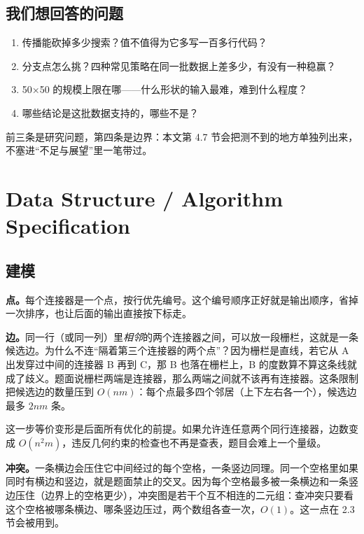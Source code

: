 \documentclass[12pt,a4paper,fontset=windows]{ctexart}
\begin{document}
\subsection{我们想回答的问题}

\begin{enumerate}[itemsep=3pt,topsep=2pt]
  \item 传播能砍掉多少搜索？值不值得为它多写一百多行代码？
  \item 分支点怎么挑？四种常见策略在同一批数据上差多少，有没有一种稳赢？
  \item 50×50 的规模上限在哪——什么形状的输入最难，难到什么程度？
  \item 哪些结论是这批数据支持的，哪些不是？
\end{enumerate}

前三条是研究问题，第四条是边界：本文第 4.7 节会把测不到的地方单独列出来，不塞进“不足与展望”里一笔带过。

\section{Data Structure / Algorithm Specification}

\subsection{建模}

\textbf{点。}每个连接器是一个点，按行优先编号。这个编号顺序正好就是输出顺序，省掉一次排序，也让后面的输出直接按下标走。

\textbf{边。}同一行（或同一列）里\emph{相邻}的两个连接器之间，可以放一段栅栏，这就是一条候选边。为什么不连“隔着第三个连接器的两个点”？因为栅栏是直线，若它从 A 出发穿过中间的连接器 B 再到 C，那 B 也落在栅栏上，B 的度数算不算这条线就成了歧义。题面说栅栏两端是连接器，那么两端之间就不该再有连接器。这条限制把候选边的数量压到 $O(nm)$：每个点最多四个邻居（上下左右各一个），候选边最多 $2nm$ 条。

这一步等价变形是后面所有优化的前提。如果允许连任意两个同行连接器，边数变成 $O(n^2m)$，违反几何约束的检查也不再是查表，题目会难上一个量级。

\textbf{冲突。}一条横边会压住它中间经过的每个空格，一条竖边同理。同一个空格里如果同时有横边和竖边，就是题面禁止的交叉。因为每个空格最多被一条横边和一条竖边压住（边界上的空格更少），冲突图是若干个互不相连的二元组：查冲突只要看这个空格被哪条横边、哪条竖边压过，两个数组各查一次，$O(1)$。这一点在 2.3 节会被用到。
\end{document}

